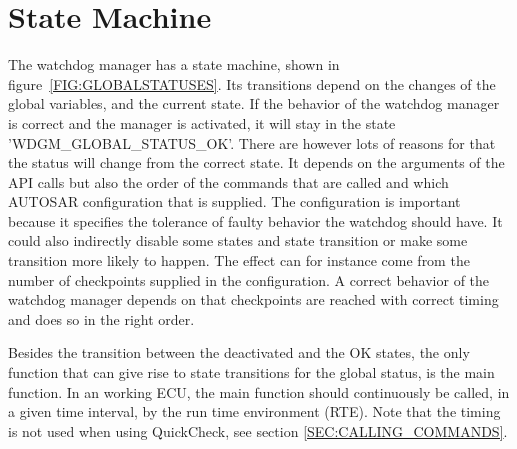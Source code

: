 
\section{State Machine}
The watchdog manager has a state machine, shown in
figure~\ref{FIG:GLOBALSTATUSES}. Its transitions depend on the changes of the
global variables, and the current state. If the behavior of the watchdog manager
is correct and the manager is activated, it will stay in the state
'WDGM\_GLOBAL\_STATUS\_OK'. There are however lots of reasons for that the
status will change from the correct state. It depends on the arguments of the
API calls but also the order of the commands that are called and which AUTOSAR
configuration that is supplied. The configuration is important because it
specifies the tolerance of faulty behavior the watchdog should have. It could
also indirectly disable some states and state transition or make some
transition more likely to happen. The effect can for instance come from the
number of checkpoints supplied in the configuration. A correct behavior of the
watchdog manager depends on that checkpoints are reached with correct timing
and does so in the right order.

Besides the transition between the deactivated and the OK states, the only
function that can give rise to state transitions for the global status, is the
main function. In an working ECU, the main function should continuously be
called, in a given time interval, by the run time environment (RTE). Note that
the timing is not used when using QuickCheck, see section \ref{SEC:CALLING_COMMANDS}.

